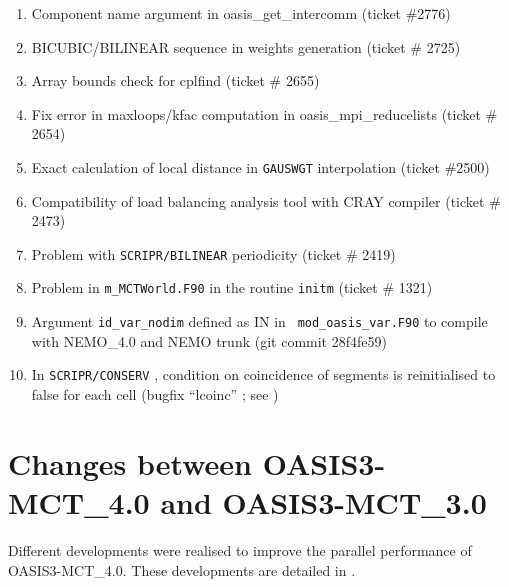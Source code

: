 \begin{itemize}
  \begin{enumerate}
  \item Component name argument in oasis\_get\_intercomm (ticket \#2776)
  \item BICUBIC/BILINEAR sequence in weights generation (ticket \# 2725)
  \item Array bounds check for cplfind (ticket \# 2655)
  \item Fix error in maxloops/kfac computation in
    oasis\_mpi\_reducelists (ticket \# 2654)
  \item Exact calculation of local distance in {\tt GAUSWGT}
    interpolation (ticket \#2500)
  \item Compatibility of load balancing analysis tool with CRAY
    compiler (ticket \# 2473)
  \item Problem with {\tt SCRIPR/BILINEAR} periodicity (ticket \# 2419)
  \item Problem in {\tt m\_MCTWorld.F90} in the routine {\tt initm} (ticket \# 1321)
  \item Argument {\tt id\_var\_nodim} defined as IN in {\tt
      mod\_oasis\_var.F90} to compile with NEMO\_4.0 and NEMO trunk (git commit 28f4fe59)
  \item In {\tt SCRIPR/CONSERV} , condition on coincidence
    of segments is reinitialised to false for each cell (bugfix ``lcoinc''  ; see \cite{valcke19})
  \end{enumerate}

\end{itemize}

\section{Changes between OASIS3-MCT\_4.0 and OASIS3-MCT\_3.0}

Different developments were realised to improve the parallel performance of OASIS3-MCT\_4.0. These developments are detailed in \cite{valcke11} .

